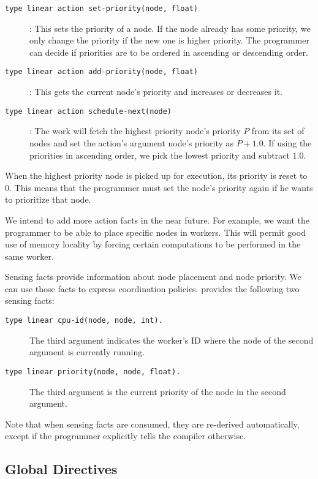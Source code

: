 \begin{description}
   \item[\texttt{type linear action set-priority(node, float)}]: This sets the priority of a node. If the node already has some priority, we only change the priority if the new one is higher priority. The programmer can decide if priorities are to be ordered in ascending or descending order.
   \item[\texttt{type linear action add-priority(node, float)}]: This gets the current node's priority and increases or decreases it.
   \item[\texttt{type linear action schedule-next(node)}]: The work will fetch the highest priority node's priority $P$ from its set of nodes and set the action's argument node's priority as $P + 1.0$. If using the priorities
   in ascending order, we pick the lowest priority and subtract $1.0$.
\end{description}

When the highest priority node is picked up for execution, its priority is reset to 0. This means that
the programmer must set the node's priority again if he wants to prioritize that node.

We intend to add more action facts in the near future. For example, we want the programmer to be able to place specific nodes in workers. This will permit good use of
memory locality by forcing certain computations to be performed in the same worker.

Sensing facts provide information about node placement and node priority. We can use those facts
to express coordination policies. \lang provides the following two
sensing facts:

\begin{description}
   \item[\texttt{type linear cpu-id(node, node, int).}] The third argument indicates the worker's ID where the node of the second argument is currently running.
   \item[\texttt{type linear priority(node, node, float).}] The third argument is the current priority of the node in the second argument.
\end{description}

Note that when sensing facts are consumed, they are re-derived automatically, except if the programmer explicitly tells the compiler otherwise. 

\subsection{Global Directives}

